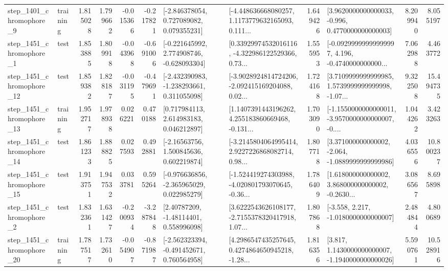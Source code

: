 \begin{tabular}{llrrrrllrlrr}
  step\_1401\_chromophore\_9 &  training &      1.815028 &    1.799662 &     -0.015366 & -0.217821 &    [-2.846378054, 0.727089082, 0.079355231] &  [-4.448636668080257, 1.1173779632165093, 0.111... &       1.649426 &   [3.9620000000000033, -0.996, 0.4770000000000003] &            8.209940 &          8.055197 \\
  step\_1451\_chromophore\_1 &      test &      1.853885 &    1.809918 &     -0.043968 & -0.691006 &   [-0.221645992, 2.774908746, -0.628093304] &  [0.33929974532016116, -4.322986122529366, 0.73... &       1.555953 &  [-0.09299999999999997, 4.196, -0.4740000000000... &            7.062988 &          4.463772 \\
 step\_1451\_chromophore\_12 &      test &      1.859382 &    1.828187 &     -0.031195 & -0.479691 &   [-2.432390983, -1.238293661, 0.311055098] &  [-3.9028924814724206, -2.092415169204088, 0.02... &       1.724168 &  [3.7109999999999985, 1.5739999999999998, -1.07... &            9.322508 &         15.494735 \\
 step\_1451\_chromophore\_13 &  training &      1.952717 &    1.978938 &      0.026221 &  0.470188 &     [0.717984113, 2.614983183, 0.046212897] &  [1.1407391443196262, 4.255183860669468, -0.131... &       1.703090 &  [-1.1550000000000011, -3.9570000000000007, -0.... &            1.044262 &          3.423263 \\
 step\_1451\_chromophore\_14 &      test &      1.861233 &    1.888825 &      0.027593 &  0.492881 &     [-2.16563756, 1.500845636, 0.602219874] &  [-3.2145804064995414, 2.9227226868082714, 0.98... &       1.807718 &   [3.371000000000002, -2.064, -1.0889999999999986] &            4.036556 &         10.800237 \\
 step\_1451\_chromophore\_15 &      test &      1.913751 &    1.947532 &      0.033781 &  0.595264 &   [-0.976636856, -2.365965029, 0.022985279] &  [-1.524419274303988, -4.020801793070645, -0.36... &       1.786409 &  [1.618000000000002, 3.868000000000002, -0.2630... &            3.086567 &          8.695898 \\
  step\_1451\_chromophore\_2 &      test &      1.832361 &    1.631427 &     -0.200934 & -3.287848 &      [2.40787209, -1.48114401, 0.558996098] &  [3.6222543626108177, -2.7155378320417918, 1.07... &       1.807868 &               [-3.558, 2.217, -1.0180000000000007] &            2.484844 &          4.800689 \\
 step\_1451\_chromophore\_20 &  training &      1.787517 &    1.732610 &     -0.054907 & -0.871987 &   [-2.562323394, -0.491452671, 0.760564958] &  [4.2986547435257645, 0.4274864650945218, -1.28... &       1.816356 &   [3.817, 1.1430000000000007, -1.1940000000000026] &            5.590761 &         10.528916 \\

\end{tabular}
